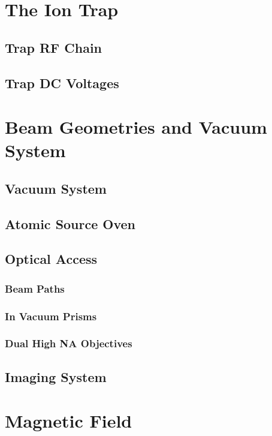 \documentclass[12pt]{report}
\begin{document}
\section{The Ion Trap}
\label{sec:The Ion Trap}

\subsection{Trap RF Chain}
\subsection{Trap DC Voltages}

\section{Beam Geometries and Vacuum System}
\label{sec:Vacuum System}
\subsection{Vacuum System}
\subsection{Atomic Source Oven}
\subsection{Optical Access}
\subsubsection{Beam Paths}
\subsubsection{In Vacuum Prisms}
\subsubsection{Dual High NA Objectives}
\subsection{Imaging System}

\section{Magnetic Field}
\label{sec:Magnetic Field}
\end{document}
